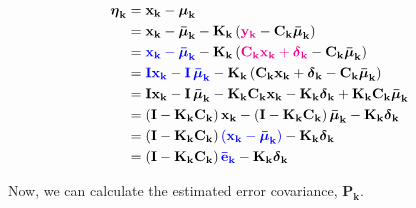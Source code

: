 \documentclass[12pt]{article}
\newcommand{\bvec}[1]{\mathbf{#1}} %
\newcommand{\mat}[1]{\mathbf{#1}}
\newcommand{\parentheses}[1]{\left(#1\right)}
\newcommand{\mb}[1]{{\boldsymbol{#1}}} %
\newcommand{\blue}[1]{\color{blue}#1\color{black}}
\newcommand{\magenta}[1]{\color{magenta}#1\color{black}}
\begin{document}
\begin{equation}
    \begin{aligned}
       \mb{\eta}_\mathbf{k} &= \bvec{x_k} - \mb{\mu}_\mathbf{k} \\
       &= \bvec{x_k} - \mb{\bar{\mu}}_\mathbf{k} - \mat{K_k}\parentheses{\magenta{\bvec{y_k}} - \mat{C_k}\mb{\bar{\mu}}_\mathbf{k}}\\
       &= \blue{\bvec{x_k} - \mb{\bar{\mu}}_\mathbf{k}} - \mat{K_k}\parentheses{\magenta{\mat{C_k}\bvec{x_k} + \mb{\delta}_\mathbf{k}} - \mat{C_k}\mb{\bar{\mu}}_\mathbf{k}}\\
       &= \blue{\mat{I}\bvec{x_k} - \mat{I}\,\mb{\bar{\mu}}_\mathbf{k}} - \mat{K_k}\parentheses{\mat{C_k}\bvec{x_k} + \mb{\delta}_\mathbf{k} - \mat{C_k}\mb{\bar{\mu}}_\mathbf{k}}\\
       &= \mat{I}\bvec{x_k} - \mat{I}\,\mb{\bar{\mu}}_\mathbf{k} - \mat{K_k}\mat{C_k}\bvec{x_k} - \mat{K_k}\mb{\delta}_\mathbf{k} + \mat{K_k}\mat{C_k}\mb{\bar{\mu}}_\mathbf{k}\\
       &= \parentheses{\mat{I} - \mat{K_k}\mat{C_k}}\bvec{x_k} - \parentheses{\mat{I} - \mat{K_k}\mat{C_k}}\mb{\bar{\mu}}_\mathbf{k} - \mat{K_k}\mb{\delta}_\mathbf{k}\\
       &= \parentheses{\mat{I} - \mat{K_k}\mat{C_k}} \blue{\parentheses{\bvec{x_k} - \mb{\bar{\mu}}_\mathbf{k}}} - \mat{K_k}\mb{\delta}_\mathbf{k}\\
       &= \parentheses{\mat{I} - \mat{K_k}\mat{C_k}} \blue{\bvec{\bar{e}_k}} - \mat{K_k}\mb{\delta}_\mathbf{k}\\
    \end{aligned}
    \label{eq:estimated-error}
\end{equation}

Now, we can calculate the estimated error covariance, $\mat{P_k}$.
\end{document}
